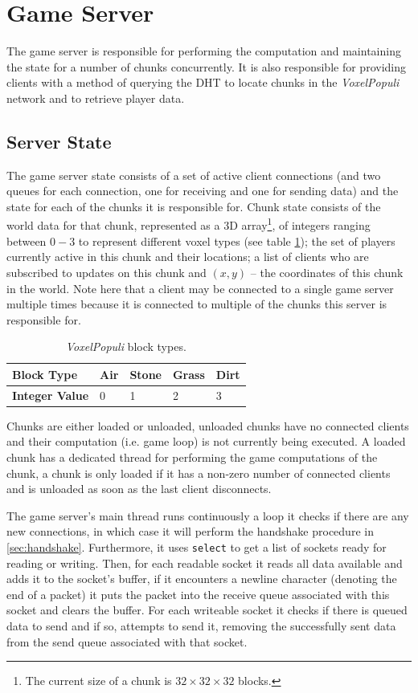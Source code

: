 \documentclass[12pt,notitlepage,a4paper]{report}
\newcommand{\voxpop}{\emph{VoxelPopuli}}
\begin{document}
	\section{Game Server}
	The game server is responsible for performing the computation and maintaining the state for a number of chunks concurrently. It is also responsible for providing clients with a method of querying the DHT to locate chunks in the \voxpop{} network and to retrieve player data.
	
	\subsection{Server State}
	The game server state consists of a set of active client connections (and two queues for each connection, one for receiving and one for sending data) and the state for each of the chunks it is responsible for. Chunk state consists of the world data for that chunk, represented as a 3D array\footnote{The current size of a chunk is $32\times32\times32$ blocks.},  of integers ranging between $0-3$ to represent different voxel types (see table \ref{tab:blocks}); the set of players currently active in this chunk and their locations; a list of clients who are subscribed to updates on this chunk and $(x,y)$ -- the coordinates of this chunk in the world. Note here that a client may be connected to a single game server multiple times because it is connected to multiple of the chunks this server is responsible for.
	
	\begin{table}
		\centering
		\begin{tabularx}{0.65\textwidth}{| l | l | l | l | X |}
			\hline
			\textbf{Block Type} & Air & Stone & Grass & Dirt \\
			\hline
			\textbf{Integer Value} & 0 & 1 & 2 & 3 \\
			\hline
		\end{tabularx}
		\caption{\voxpop{} block types.}
		\label{tab:blocks}
	\end{table}
	
	Chunks are either loaded or unloaded, unloaded chunks have no connected clients and their computation (i.e. game loop) is not currently being executed. A loaded chunk has a dedicated thread for performing the game computations of the chunk, a chunk is only loaded if it has a non-zero number of connected clients and is unloaded as soon as the last client disconnects.
	
	The game server's main thread runs continuously a loop it checks if there are any new connections, in which case it will perform the handshake procedure in \cref{sec:handshake}. Furthermore, it uses \texttt{select} to get a list of sockets ready for reading or writing. Then, for each readable socket it reads all data available and adds it to the socket's buffer, if it encounters a newline character (denoting the end of a packet) it puts the packet into the receive queue associated with this socket and clears the buffer. For each writeable socket it checks if there is queued data to send and if so, attempts to send it, removing the successfully sent data from the send queue associated with that socket.
	
\end{document}
